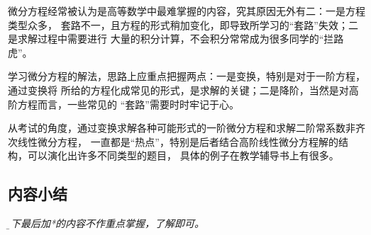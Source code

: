 微分方程经常被认为是高等数学中最难掌握的内容，究其原因无外有二：一是方程类型众多，
套路不一，且方程的形式稍加变化，即导致所学习的“套路”失效；二是求解过程中需要进行
大量的积分计算，不会积分常常成为很多同学的“拦路虎”。

学习微分方程的解法，思路上应重点把握两点：一是变换，特别是对于一阶方程，通过变换将
所给的方程化成常见的形式，是求解的关键；二是降阶，当然是对高阶方程而言，一些常见的
“套路”需要时时牢记于心。

从考试的角度，通过变换求解各种可能形式的一阶微分方程和求解二阶常系数非齐次线性微分方程，
一直都是“热点”，特别是后者结合高阶线性微分方程解的结构，可以演化出许多不同类型的题目，
具体的例子在教学辅导书上有很多。

\subsection{内容小结}

{\it\b 以下最后加*的内容不作重点掌握，了解即可。}

